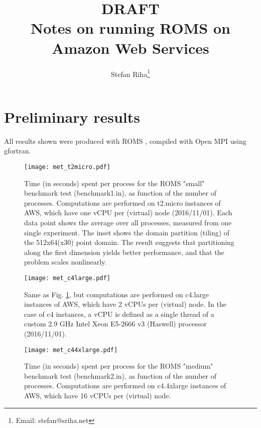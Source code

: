 \documentclass[12pt,a4paper]{article}
\title{
	{\bf DRAFT}\\
	Notes on running ROMS on Amazon Web Services 
}
\author{Stefan Riha\thanks{Email: stefan@sriha.net}}
\begin{document}
	\setlength{\parindent}{0cm}
	\maketitle

\section{Preliminary results}
	All results shown were produced with ROMS \citep{shchepetkin2005regional}, compiled with Open MPI using gfortran.
	
	\begin{figure}[H]
		\centering
		\texttt{[image: met\_t2micro.pdf]}
		\caption{Time (in seconds) spent per process for the ROMS "small" benchmark test (benchmark1.in), as function of the number of processes. Computations are performed on t2.micro instances of AWS, which have one vCPU per (virtual) node (2016/11/01). Each data point shows the average over all processes, measured from one single experiment. The inset shows the domain partition (tiling) of the 512x64(x30) point domain. The result suggests that partitioning along the first dimension yields better performance, and that the problem scales nonlinearly.}
		\label{fig:met_t2micro}
	\end{figure}

	\begin{figure}[H]
	\centering
	\texttt{[image: met\_c4large.pdf]}
	\caption{Same as Fig. \ref{fig:met_t2micro}, but computations are performed on c4.large instances of AWS, which have 2 vCPUs per (virtual) node. In the case of c4 instances, a vCPU is defined as a single thread of a custom 2.9 GHz Intel Xeon E5-2666 v3 (Haswell) processor (2016/11/01).}
	\label{fig:met_c4large}
\end{figure}

\begin{figure}[H]
	\centering
	\texttt{[image: met\_c44xlarge.pdf]}
	\caption{Time (in seconds) spent per process for the ROMS "medium" benchmark test (benchmark2.in), as function of the number of processes. Computations are performed on c4.4xlarge instances of AWS, which have 16 vCPUs per (virtual) node.}
	\label{fig:met_c4large}
\end{figure}
	


\end{document}
